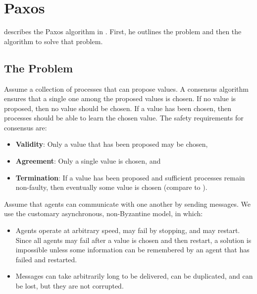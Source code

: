 \section{Paxos}
\citeauthor{Lamport01} describes the Paxos algorithm in \cite{Lamport01}.
First, he outlines the problem and then the algorithm to solve that problem.

\subsection{The Problem}
Assume a collection of processes that can propose values.
A consensus algorithm ensures that a single one among the proposed values is chosen.
If no value is proposed, then no value should be chosen.
If a value has been chosen, then processes should be able to learn the chosen value.
The safety requirements for consensus are:

\begin{itemize}
    \item \textbf{Validity}: Only a value that has been proposed may be chosen,
    \item \textbf{Agreement}: Only a single value is chosen, and
    \item \textbf{Termination}: If a value has been proposed and sufficient processes remain non-faulty, then eventually some value is chosen (compare to \cite{Lamport05}).
\end{itemize}


Assume that agents can communicate with one another by sending messages.
We use the customary asynchronous, non-Byzantine model, in which:

\begin{itemize}
    \item Agents operate at arbitrary speed, may fail by stopping, and may restart.
    Since all agents may fail after a value is chosen and then restart, a solution is impossible unless some information can be remembered by an agent that has failed and restarted.
    \item Messages can take arbitrarily long to be delivered, can be duplicated, and can be lost, but they are not corrupted.
\end{itemize}


